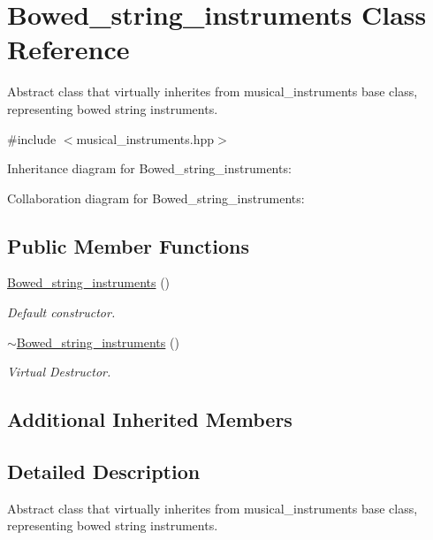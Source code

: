 \hypertarget{classBowed__string__instruments}{}\section{Bowed\+\_\+string\+\_\+instruments Class Reference}
\label{classBowed__string__instruments}


Abstract class that virtually inherites from musical\+\_\+instruments base class, representing bowed string instruments.  




{\ttfamily \#include $<$musical\+\_\+instruments.\+hpp$>$}



Inheritance diagram for Bowed\+\_\+string\+\_\+instruments\+:


Collaboration diagram for Bowed\+\_\+string\+\_\+instruments\+:
\subsection*{Public Member Functions}
\begin{DoxyCompactItemize}
\item 
\hyperlink{classBowed__string__instruments_aade61a298a55a8284261655d8ab919a2}{Bowed\+\_\+string\+\_\+instruments} ()
\begin{DoxyCompactList}\small\item\em Default constructor. \end{DoxyCompactList}\item 
\hyperlink{classBowed__string__instruments_ac8bd806e70726e2566b2ef22b68e861a}{$\sim$\+Bowed\+\_\+string\+\_\+instruments} ()
\begin{DoxyCompactList}\small\item\em Virtual Destructor. \end{DoxyCompactList}\end{DoxyCompactItemize}
\subsection*{Additional Inherited Members}


\subsection{Detailed Description}
Abstract class that virtually inherites from musical\+\_\+instruments base class, representing bowed string instruments. 

